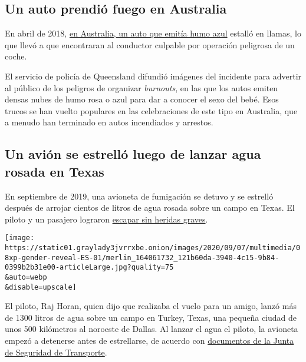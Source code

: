 \hypertarget{un-auto-prendiuxf3-fuego-en-australia}{%
\subsection{Un auto prendió fuego en
Australia}\label{un-auto-prendiuxf3-fuego-en-australia}}

En abril de 2018,
\href{https://www.cnn.com/2019/07/09/australia/australia-gender-reveal-party-scli-intl/index.html}{en
Australia, un auto que emitía humo azul} estalló en llamas, lo que llevó
a que encontraran al conductor culpable por operación peligrosa de un
coche.

El servicio de policía de Queensland difundió imágenes del incidente
para advertir al público de los peligros de organizar \emph{burnouts},
en las que los autos emiten densas nubes de humo rosa o azul para dar a
conocer el sexo del bebé. Esos trucos se han vuelto populares en las
celebraciones de este tipo en Australia, que a menudo han terminado en
autos incendiados y arrestos.

\hypertarget{un-aviuxf3n-se-estrelluxf3-luego-de-lanzar-agua-rosada-en-texas}{%
\subsection{Un avión se estrelló luego de lanzar agua rosada en
Texas}\label{un-aviuxf3n-se-estrelluxf3-luego-de-lanzar-agua-rosada-en-texas}}

En septiembre de 2019, una avioneta de fumigación se detuvo y se
estrelló después de arrojar cientos de litros de agua rosada sobre un
campo en Texas. El piloto y un pasajero lograron
\href{https://www.nytimes3xbfgragh.onion/2019/11/08/us/gender-reveal-plane-crash.html}{escapar
sin heridas graves}.

\texttt{[image: https://static01.graylady3jvrrxbe.onion/images/2020/09/07/multimedia/08xp-gender-reveal-ES-01/merlin\_164061732\_121b60da-3940-4c15-9b84-0399b2b31e00-articleLarge.jpg?quality=75\\\&auto=webp\\\&disable=upscale]}

El piloto, Raj Horan, quien dijo que realizaba el vuelo para un amigo,
lanzó más de 1300 litros de agua sobre un campo en Turkey, Texas, una
pequeña ciudad de unos 500 kilómetros al noroeste de Dallas. Al lanzar
el agua el piloto, la avioneta empezó a detenerse antes de estrellarse,
de acuerdo con
\href{https://dms.ntsb.gov/pubdms/search/hitlist.cfm?docketID=62993\&CFID=1151577\&CFTOKEN=28b5c40598982e8d-26378EDF-5056-942C-92E9E5EA4503527F}{documentos
de la Junta de Seguridad de Transporte}.

